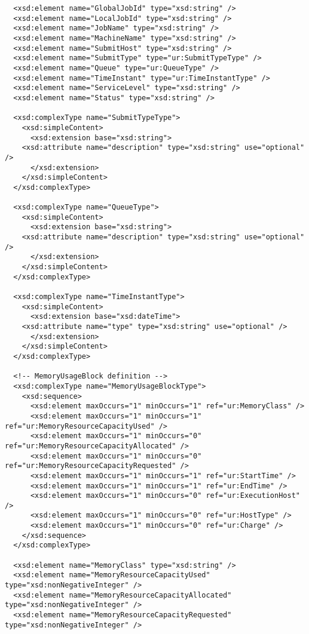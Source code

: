 \begin{verbatim}
  <xsd:element name="GlobalJobId" type="xsd:string" />
  <xsd:element name="LocalJobId" type="xsd:string" />
  <xsd:element name="JobName" type="xsd:string" />
  <xsd:element name="MachineName" type="xsd:string" />
  <xsd:element name="SubmitHost" type="xsd:string" />
  <xsd:element name="SubmitType" type="ur:SubmitTypeType" />
  <xsd:element name="Queue" type="ur:QueueType" />
  <xsd:element name="TimeInstant" type="ur:TimeInstantType" />
  <xsd:element name="ServiceLevel" type="xsd:string" />
  <xsd:element name="Status" type="xsd:string" />

  <xsd:complexType name="SubmitTypeType">
    <xsd:simpleContent>
      <xsd:extension base="xsd:string">
	<xsd:attribute name="description" type="xsd:string" use="optional" />
      </xsd:extension>
    </xsd:simpleContent>
  </xsd:complexType>

  <xsd:complexType name="QueueType">
    <xsd:simpleContent>
      <xsd:extension base="xsd:string">
	<xsd:attribute name="description" type="xsd:string" use="optional" />
      </xsd:extension>
    </xsd:simpleContent>
  </xsd:complexType>

  <xsd:complexType name="TimeInstantType">
    <xsd:simpleContent>
      <xsd:extension base="xsd:dateTime">
	<xsd:attribute name="type" type="xsd:string" use="optional" />
      </xsd:extension>
    </xsd:simpleContent>
  </xsd:complexType>

  <!-- MemoryUsageBlock definition -->
  <xsd:complexType name="MemoryUsageBlockType">
    <xsd:sequence>
      <xsd:element maxOccurs="1" minOccurs="1" ref="ur:MemoryClass" />
      <xsd:element maxOccurs="1" minOccurs="1" ref="ur:MemoryResourceCapacityUsed" />
      <xsd:element maxOccurs="1" minOccurs="0" ref="ur:MemoryResourceCapacityAllocated" />
      <xsd:element maxOccurs="1" minOccurs="0" ref="ur:MemoryResourceCapacityRequested" />
      <xsd:element maxOccurs="1" minOccurs="1" ref="ur:StartTime" />
      <xsd:element maxOccurs="1" minOccurs="1" ref="ur:EndTime" />
      <xsd:element maxOccurs="1" minOccurs="0" ref="ur:ExecutionHost" />
      <xsd:element maxOccurs="1" minOccurs="0" ref="ur:HostType" />
      <xsd:element maxOccurs="1" minOccurs="0" ref="ur:Charge" />
    </xsd:sequence>
  </xsd:complexType>

  <xsd:element name="MemoryClass" type="xsd:string" />
  <xsd:element name="MemoryResourceCapacityUsed" type="xsd:nonNegativeInteger" />
  <xsd:element name="MemoryResourceCapacityAllocated" type="xsd:nonNegativeInteger" />
  <xsd:element name="MemoryResourceCapacityRequested" type="xsd:nonNegativeInteger" />


\end{verbatim}

